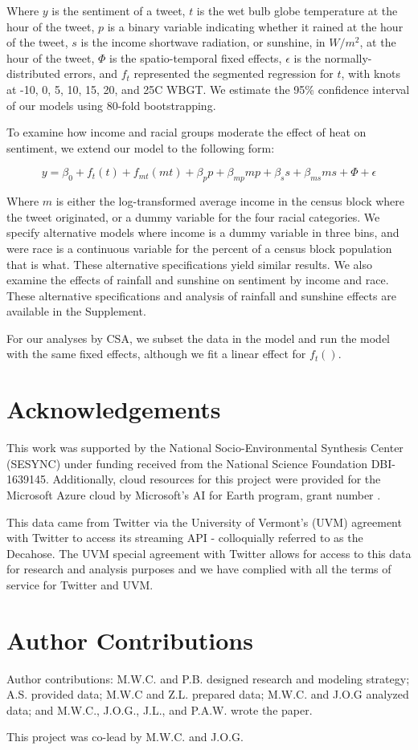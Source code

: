 \documentclass{article}
\begin{document}
Where $y$ is the sentiment of a tweet, $t$ is the wet bulb globe temperature at the hour of the tweet, $p$ is a binary variable indicating whether it rained at the hour of the tweet, $s$ is the income shortwave radiation, or sunshine, in $W/m^2$, at the hour of the tweet, $\Phi$ is the spatio-temporal fixed effects, $\epsilon$ is the normally-distributed errors, and $f_t$ represented the segmented regression for $t$, with knots at -10\textdegree, 0\textdegree, 5\textdegree, 10\textdegree, 15\textdegree, 20\textdegree, and 25\textdegree C WBGT.  We estimate the 95\% confidence interval of our models using 80-fold bootstrapping.  

To examine how income and racial groups moderate the effect of heat on sentiment, we extend our model to the following form:

\begin{equation}
    y = \beta_0 + f_t(t) + f_{mt}(m t) + \beta_p p + \beta_{mp} m p + \beta_s s + \beta_{ms} m s + \Phi + \epsilon
\end{equation}

Where $m$ is either the log-transformed average income in the census block where the tweet originated, or a dummy variable for the four racial categories.  We specify alternative models where income is a dummy variable in three bins, and were race is a continuous variable for the percent of a census block population that is what.  These alternative specifications yield similar results.  We also examine the effects of rainfall and sunshine on sentiment by income and race.  These alternative specifications and analysis of rainfall and sunshine effects are available in the Supplement.

For our analyses by CSA, we subset the data in the model and run the model with the same fixed effects, although we fit a linear effect for $f_t()$.


\section{Acknowledgements}
This work was supported by the National Socio-Environmental Synthesis Center (SESYNC) under funding received from the National Science Foundation DBI-1639145.  Additionally, cloud resources for this project were provided for the Microsoft Azure cloud by Microsoft's AI for Earth program, grant number .

This data came from Twitter via the University of Vermont’s (UVM) agreement with Twitter to access its streaming API - colloquially referred to as the Decahose.  The UVM special agreement with Twitter allows for access to this data for research and analysis purposes and we have complied with all the terms of service for Twitter and UVM. 
\printbibliography

\section{Author Contributions}
Author contributions: M.W.C. and P.B. designed research and modeling strategy; A.S. provided data; M.W.C and Z.L. prepared data; M.W.C. and J.O.G analyzed data; and M.W.C., J.O.G., J.L., and P.A.W. wrote the paper.

This project was co-lead by M.W.C. and J.O.G.
\end{document}
